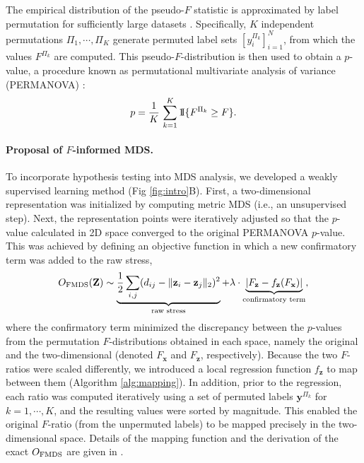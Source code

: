 \documentclass[10pt,letterpaper]{article}
\newcommand{\1}{{\rm 1}\kern-0.24em{\rm I}}
\begin{document}
The empirical distribution of the pseudo-$F$ statistic is approximated by label permutation for sufficiently large datasets \cite{holmes96, gijbels13}.
Specifically, $K$ independent permutations $\Pi_1 , \cdots ,\Pi_K$ generate permuted label sets $[y_i^{\Pi_k}]_{i=1}^{N}$, from which the values $F^{\Pi_k}$ are computed. This pseudo-$F$-distribution is then used to obtain a $p$-value, a procedure known as permutational multivariate analysis of variance (PERMANOVA) \cite{anderson01}:
\begin{equation}
p = \frac{1}{K}\,\sum_{k=1}^{K}\1\{F^{\Pi_k}\geq F\}.
\end{equation}

\paragraph*{Proposal of $F$-informed MDS.}
To incorporate hypothesis testing into MDS analysis, we developed a weakly supervised learning method (Fig \ref{fig:intro}B).
First, a two-dimensional representation was initialized by computing metric MDS (i.e., an unsupervised step).
Next, the representation points were iteratively adjusted so that the $p$-value calculated in 2D space converged to the original PERMANOVA $p$-value.
This was achieved by defining an objective function in which a new confirmatory term was added to the raw stress,
\begin{equation} \label{eq:fmds}
    O_{\rm FMDS}(\mathbf{Z}) \sim
    \underbrace{\frac{1}{2}\sum_{i,j} (d_{ij} - \| \mathbf{z}_i - \mathbf{z}_j \|_2 )^2}_\text{raw stress} +
    \lambda\cdot \underbrace{\left|F_\mathbf{z} - f_\mathbf{z}(F_\mathbf{x})\right|}_\text{confirmatory term},
\end{equation}
where the confirmatory term minimized the discrepancy between the $p$-values from the permutation $F$-distributions obtained in each space, namely the original and the two-dimensional (denoted $F_\mathbf{x}$ and $F_\mathbf{z}$, respectively).
Because the two $F$-ratios were scaled differently, we introduced a local regression function $f_\mathbf{z}$ to map between them (Algorithm \ref{alg:mapping}). In addition, prior to the regression, each ratio was computed iteratively using a set of permuted labels $\mathbf{y}^{\Pi_k}$ for $k=1, \cdots, K$, and the resulting values were sorted by magnitude. This enabled the original $F$-ratio (from the unpermuted labels) to be mapped precisely in the two-dimensional space.
Details of the mapping function and the derivation of the exact $O_{\rm FMDS}$ are given in .
\end{document}
